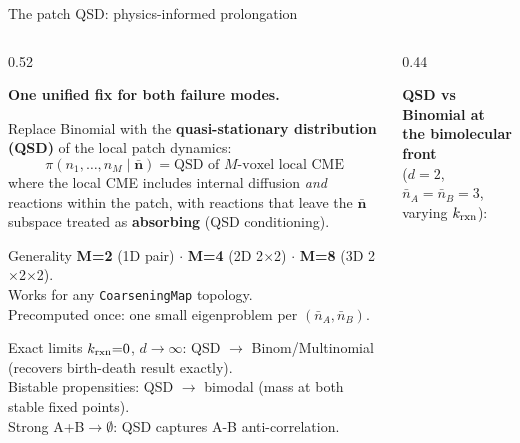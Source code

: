 \documentclass[10pt,aspectratio=169]{beamer}
\begin{document}
\begin{frame}{The patch QSD: physics-informed prolongation}

  \begin{columns}[T]
    \begin{column}{0.52\textwidth}

      \textbf{One unified fix for both failure modes.}

      \medskip
      Replace Binomial with the \textbf{quasi-stationary distribution (QSD)}
      of the local patch dynamics:
      \[
        \pi(n_1,\ldots,n_M \mid \bar{\mathbf{n}})
        = \text{QSD of } M\text{-voxel local CME}
      \]
      \vspace{-0.3em}
      where the local CME includes internal diffusion \emph{and} reactions
      within the patch, with reactions that leave the $\bar{\mathbf{n}}$ subspace
      treated as \textbf{absorbing} (QSD conditioning).

      \medskip
      \begin{block}{Generality}
        \textbf{M=2} (1D pair) $\cdot$ \textbf{M=4} (2D 2$\times$2) $\cdot$
        \textbf{M=8} (3D 2$\times$2$\times$2).\\
        Works for any \texttt{CoarseningMap} topology.\\
        Precomputed once: one small eigenproblem per $(\bar n_A, \bar n_B)$.
      \end{block}

      \medskip
      \begin{block}{Exact limits}
        $k_{\rm rxn}{=}0$, $d{\to}\infty$: QSD $\to$ Binom/Multinomial (recovers birth-death result exactly).\\[0.2em]
        Bistable propensities: QSD $\to$ bimodal (mass at both stable fixed points).\\[0.2em]
        Strong A+B${\to}\emptyset$: QSD captures A-B anti-correlation.
      \end{block}

    \end{column}
    \begin{column}{0.44\textwidth}

      \textbf{QSD vs Binomial at the bimolecular front}\\
      ($d{=}2$, $\bar n_A{=}\bar n_B{=}3$, varying $k_{\rm rxn}$):


\end{column}
\end{columns}
\end{frame}
\end{document}
